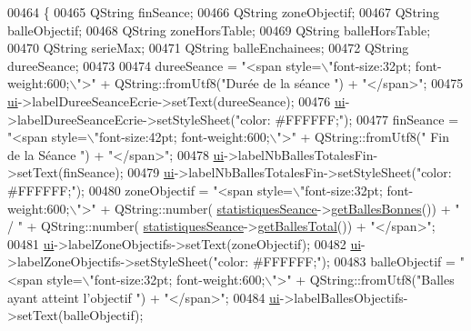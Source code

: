 \begin{DoxyCode}
00464 \{
00465     QString finSeance;
00466     QString zoneObjectif;
00467     QString balleObjectif;
00468     QString zoneHorsTable;
00469     QString balleHorsTable;
00470     QString serieMax;
00471     QString balleEnchainees;
00472     QString dureeSeance;
00473 
00474     dureeSeance = \textcolor{stringliteral}{"<span style=\(\backslash\)"font-size:32pt; font-weight:600;\(\backslash\)">"} + QString::fromUtf8(\textcolor{stringliteral}{"Durée de la
       séance "}) + \textcolor{stringliteral}{"</span>"};
00475     \hyperlink{class_ttpa_ihm_ad5fae1222a667da158c26f3d0f0dce23}{ui}->labelDureeSeanceEcrie->setText(dureeSeance);
00476     \hyperlink{class_ttpa_ihm_ad5fae1222a667da158c26f3d0f0dce23}{ui}->labelDureeSeanceEcrie->setStyleSheet(\textcolor{stringliteral}{"color: #FFFFFF;"});
00477     finSeance =  \textcolor{stringliteral}{"<span style=\(\backslash\)"font-size:42pt; font-weight:600;\(\backslash\)">"} + QString::fromUtf8(\textcolor{stringliteral}{" Fin de la Séance
       "}) + \textcolor{stringliteral}{"</span>"};
00478     \hyperlink{class_ttpa_ihm_ad5fae1222a667da158c26f3d0f0dce23}{ui}->labelNbBallesTotalesFin->setText(finSeance);
00479     \hyperlink{class_ttpa_ihm_ad5fae1222a667da158c26f3d0f0dce23}{ui}->labelNbBallesTotalesFin->setStyleSheet(\textcolor{stringliteral}{"color: #FFFFFF;"});
00480     zoneObjectif = \textcolor{stringliteral}{"<span style=\(\backslash\)"font-size:32pt; font-weight:600;\(\backslash\)">"} + QString::number(
      \hyperlink{class_ttpa_ihm_abed6897d6f7b4d3a5eb8dcc07651e740}{statistiquesSeance}->\hyperlink{class_statistiques_seance_a0dad2ceb22672adf343548b35bf86ba1}{getBallesBonnes}())  + \textcolor{stringliteral}{" / "} + QString::number(
      \hyperlink{class_ttpa_ihm_abed6897d6f7b4d3a5eb8dcc07651e740}{statistiquesSeance}->\hyperlink{class_statistiques_seance_aaefd0b775012ec914a36a262dc14fc66}{getBallesTotal}()) + \textcolor{stringliteral}{"</span>"};
00481     \hyperlink{class_ttpa_ihm_ad5fae1222a667da158c26f3d0f0dce23}{ui}->labelZoneObjectifs->setText(zoneObjectif);
00482     \hyperlink{class_ttpa_ihm_ad5fae1222a667da158c26f3d0f0dce23}{ui}->labelZoneObjectifs->setStyleSheet(\textcolor{stringliteral}{"color: #FFFFFF;"});
00483     balleObjectif = \textcolor{stringliteral}{"<span style=\(\backslash\)"font-size:32pt; font-weight:600;\(\backslash\)">"} + QString::fromUtf8(\textcolor{stringliteral}{"Balles ayant
       atteint l'objectif "}) + \textcolor{stringliteral}{"</span>"};
00484     \hyperlink{class_ttpa_ihm_ad5fae1222a667da158c26f3d0f0dce23}{ui}->labelBallesObjectifs->setText(balleObjectif);

\end{DoxyCode}
